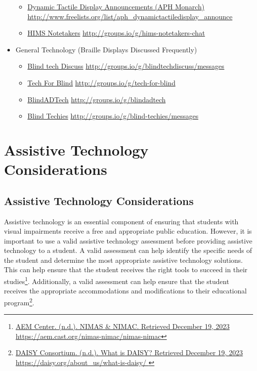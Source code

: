 \documentclass[12pt,letterpaper,twoside]{extreport}
\begin{document}
\begin{appendices}
\begin{itemize}[leftmargin=*]
\begin{itemize}[leftmargin=2em]
\item \href{http://www.freelists.org/list/aph_dynamictactiledisplay_announce}{Dynamic Tactile Display Announcements (APH Monarch)}  \break\url{http://www.freelists.org/list/aph_dynamictactiledisplay_announce}
\item \href{http://groups.io/g/hims-notetakers-chat}{HIMS Notetakers}  \break\url{http://groups.io/g/hims-notetakers-chat}
\end{itemize}
\item General Technology (Braille Displays Discussed Frequently)
\begin{itemize}[leftmargin=2em]
\item \href{http://groups.io/g/blindtechdiscuss/messages}{Blind tech Discuss}  \break\url{http://groups.io/g/blindtechdiscuss/messages}
\item \href{http://groups.io/g/tech-for-blind}{Tech For Blind}  \break\url{http://groups.io/g/tech-for-blind}
\item \href{http://groups.io/g/blindadtech}{BlindADTech}  \break\url{http://groups.io/g/blindadtech}
\item \href{http://groups.io/g/blind-techies/messages}{Blind Techies}  \break\url{http://groups.io/g/blind-techies/messages}
\end{itemize}
\end{itemize}

\cleardoublepage\hypertarget{trouble3}{}\chapter[\raggedright Assistive Technology Considerations\hfill\\]{Assistive Technology Considerations}\label{trouble3}
\minitoc \newpage
\hypertarget{trouble5}{}\section[Assistive Technology Considerations]{Assistive Technology Considerations}\label{trouble5}
\minitoc \newpage
Assistive technology is an essential component of ensuring that students with visual impairments receive a free and appropriate public education. However, it is important to use a valid assistive technology assessment before providing assistive technology to a student. A valid assessment can help identify the specific needs of the student and determine the most appropriate assistive technology solutions. This can help ensure that the student receives the right tools to succeed in their studies\footnote{\raggedright \href{https://aem.cast.org/nimas-nimac/nimas-nimac}{AEM Center. (n.d.). NIMAS \& NIMAC. Retrieved December 19, 2023} \url{https://aem.cast.org/nimas-nimac/nimas-nimac}}. Additionally, a valid assessment can help ensure that the student receives the appropriate accommodations and modifications to their educational program\footnote{\raggedright \href{https://daisy.org/about_us/what-is-daisy/ }{DAISY Consortium. (n.d.). What is DAISY? Retrieved December 19, 2023} \url{https://daisy.org/about_us/what-is-daisy/ }}.


\end{appendices}
\end{document}
